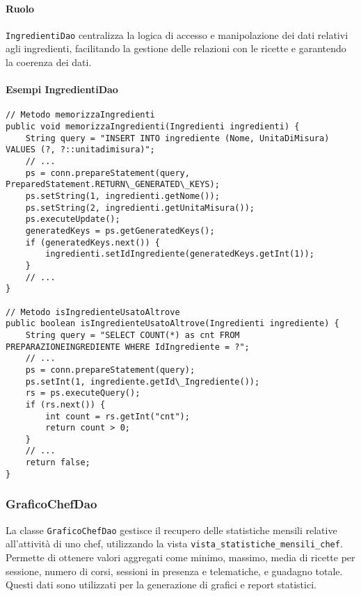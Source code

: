 \paragraph{Ruolo}
\texttt{IngredientiDao} centralizza la logica di accesso e manipolazione dei dati relativi agli ingredienti, facilitando la gestione delle relazioni con le ricette e garantendo la coerenza dei dati.

\paragraph{Esempi IngredientiDao}
\begin{verbatim}
// Metodo memorizzaIngredienti
public void memorizzaIngredienti(Ingredienti ingredienti) {
    String query = "INSERT INTO ingrediente (Nome, UnitaDiMisura) VALUES (?, ?::unitadimisura)";
    // ...
    ps = conn.prepareStatement(query, PreparedStatement.RETURN\_GENERATED\_KEYS);
    ps.setString(1, ingredienti.getNome());
    ps.setString(2, ingredienti.getUnitaMisura());
    ps.executeUpdate();
    generatedKeys = ps.getGeneratedKeys();
    if (generatedKeys.next()) {
        ingredienti.setIdIngrediente(generatedKeys.getInt(1));
    }
    // ...
}

// Metodo isIngredienteUsatoAltrove
public boolean isIngredienteUsatoAltrove(Ingredienti ingrediente) {
    String query = "SELECT COUNT(*) as cnt FROM PREPARAZIONEINGREDIENTE WHERE IdIngrediente = ?";
    // ...
    ps = conn.prepareStatement(query);
    ps.setInt(1, ingrediente.getId\_Ingrediente());
    rs = ps.executeQuery();
    if (rs.next()) {
        int count = rs.getInt("cnt");
        return count > 0;
    }
    // ...
    return false;
}
\end{verbatim}

\subsubsection{GraficoChefDao}
La classe \texttt{GraficoChefDao} gestisce il recupero delle statistiche mensili relative all'attività di uno chef, utilizzando la vista \texttt{vista\_statistiche\_mensili\_chef}. Permette di ottenere valori aggregati come minimo, massimo, media di ricette per sessione, numero di corsi, sessioni in presenza e telematiche, e guadagno totale. Questi dati sono utilizzati per la generazione di grafici e report statistici.

